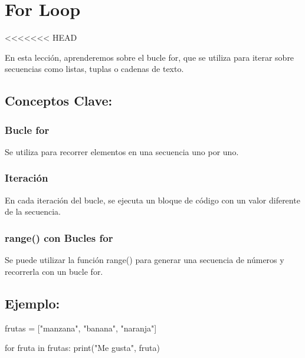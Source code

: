 \documentclass[
  a4paper,
  onepage,
  openany]{scrreprt}
\newenvironment{Shaded}{\begin{snugshade}}{\end{snugshade}}
\newcommand{\BuiltInTok}[1]{\textcolor[rgb]{0.00,0.23,0.31}{#1}}
\newcommand{\ControlFlowTok}[1]{\textcolor[rgb]{0.00,0.23,0.31}{#1}}
\newcommand{\KeywordTok}[1]{\textcolor[rgb]{0.00,0.23,0.31}{#1}}
\newcommand{\NormalTok}[1]{\textcolor[rgb]{0.00,0.23,0.31}{#1}}
\newcommand{\OperatorTok}[1]{\textcolor[rgb]{0.37,0.37,0.37}{#1}}
\newcommand{\StringTok}[1]{\textcolor[rgb]{0.13,0.47,0.30}{#1}}
\begin{document}
\hypertarget{for-loop}{%
\chapter{For Loop}\label{for-loop}}

\textless\textless\textless\textless\textless\textless\textless{} HEAD

En esta lección, aprenderemos sobre el bucle for, que se utiliza para
iterar sobre secuencias como listas, tuplas o cadenas de texto.

\hypertarget{conceptos-clave-42}{%
\section{Conceptos Clave:}\label{conceptos-clave-42}}

\hypertarget{bucle-for}{%
\subsection{Bucle for}\label{bucle-for}}

Se utiliza para recorrer elementos en una secuencia uno por uno.

\hypertarget{iteraciuxf3n}{%
\subsection{Iteración}\label{iteraciuxf3n}}

En cada iteración del bucle, se ejecuta un bloque de código con un valor
diferente de la secuencia.

\hypertarget{range-con-bucles-for}{%
\subsection{range() con Bucles for}\label{range-con-bucles-for}}

Se puede utilizar la función range() para generar una secuencia de
números y recorrerla con un bucle for.

\hypertarget{ejemplo-42}{%
\section{Ejemplo:}\label{ejemplo-42}}

\begin{Shaded}
\begin{Highlighting}[]
\NormalTok{frutas }\OperatorTok{=}\NormalTok{ [}\StringTok{"manzana"}\NormalTok{, }\StringTok{"banana"}\NormalTok{, }\StringTok{"naranja"}\NormalTok{]}

\ControlFlowTok{for}\NormalTok{ fruta }\KeywordTok{in}\NormalTok{ frutas:}
    \BuiltInTok{print}\NormalTok{(}\StringTok{"Me gusta"}\NormalTok{, fruta)}
\end{Highlighting}
\end{Shaded}
\end{document}
